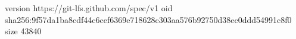 version https://git-lfs.github.com/spec/v1
oid sha256:9f57da1ba8cdf44c6cef6369e718628c303aa576b92750d38ec0ddd54991c8f0
size 43840
